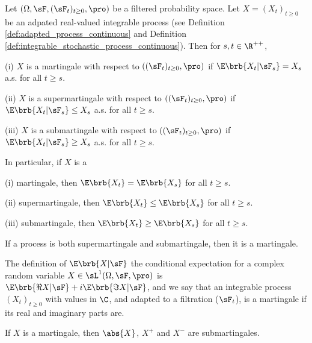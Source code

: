 \begin{definition}\label{def:martingale_super_sub_continuous}
Let $(\Omega,\sF, (\sF_t)_{t\geq 0},\pro)$ be a filtered probability space. Let $X = (X_t)_{t\geq 0}$ be an adpated real-valued integrable process (see Definition \ref{def:adapted_process_continuous} and Definition \ref{def:integrable_stochastic_process_continuous}). Then for $s,t\in \R^{++}$,
\ben
\item [(i)] $X$ is a martingale with respect to $((\sF_t)_{t\geq 0},\pro)$ if $\E\brb{X_t | \sF_s} = X_s$ a.s. for all $t \geq s$.
\item [(ii)] $X$ is a supermartingale with respect to $((\sF_t)_{t\geq 0},\pro)$ if $\E\brb{X_t | \sF_s}\leq X_s$ a.s. for all $t\geq s$.
\item [(iii)] $X$ is a submartingale with respect to $((\sF_t)_{t\geq 0},\pro)$ if $\E\brb{X_t | \sF_s} \geq X_s$ a.s. for all $t\geq s$.
\een

In particular, if $X$ is a
\ben
\item [(i)] martingale, then $\E\brb{X_t} = \E\brb{X_s}$ for all $t\geq s$.
\item [(ii)] supermartingale, then $\E\brb{X_t} \leq \E\brb{X_s}$ for all $t\geq s$.
\item [(iii)] submartingale, then $\E\brb{X_t} \geq \E\brb{X_s}$ for all $t\geq s$.
\een
\end{definition}

\begin{remark}
If a process is both supermartingale and submartingale, then it is a martingale.
\end{remark}

\begin{remark}
The definition of $\E\brb{X|\sF}$ the conditional expectation for a complex random variable $X \in \sL^1(\Omega,\sF,\pro)$ is $\E\brb{\Re X|\sF} + i\E\brb{\Im X|\sF}$, and we say that an integrable process $(X_t)_{t \geq 0}$
with values in $\C$, and adapted to a filtration ($\sF_t$), is a martingale if its real and imaginary parts are.
\end{remark}

\begin{proposition}\label{pro:martingale_abs_plus_minus_submartingale}
If $X$ is a martingale, then $\abs{X}$, $X^+$ and $X^-$ are submartingales.
\end{proposition}

